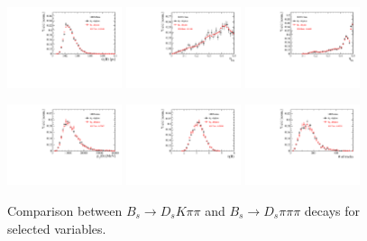 \begin{figure}[h]
\includegraphics[height=!,width=0.3\textwidth]{figs/dataVsMC/norm2signal/Ds2all_Bs_BsDTF_TAUERR.pdf}
\includegraphics[height=!,width=0.3\textwidth]{figs/dataVsMC/norm2signal/Ds2all_OS_Combination_PROB.pdf}
\includegraphics[height=!,width=0.3\textwidth]{figs/dataVsMC/norm2signal/Ds2all_SS_Kaon_PROB.pdf}


\caption{Comparison between $B_s \to D_s K \pi \pi$ and $B_s \to D_s \pi \pi \pi$ decays for selected variables.}
\label{fig:}

\includegraphics[height=!,width=0.3\textwidth]{figs/dataVsMC/B0vsBs_signal/Ds2all_Bs_PT.pdf}
\includegraphics[height=!,width=0.3\textwidth]{figs/dataVsMC/B0vsBs_signal/Ds2all_Bs_ETA.pdf}
\includegraphics[height=!,width=0.3\textwidth]{figs/dataVsMC/B0vsBs_signal/Ds2all_NTracks.pdf}


\end{figure}
